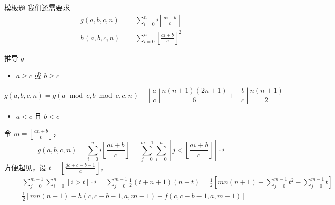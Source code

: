 \documentclass[UTF8]{beamer}
\begin{document}
    \begin{frame}{模板题}
        我们还需要求
        $$
        \begin{aligned}
        g(a,b,c,n)&=\sum_{i=0}^ni\left\lfloor \frac{ai+b}{c} \right\rfloor\\
        h(a,b,c,n)&=\sum_{i=0}^n\left\lfloor \frac{ai+b}{c} \right\rfloor^2
        \end{aligned}
        $$
    \end{frame}
    \begin{frame}{推导 $g$}
        \begin{itemize}
            \item $a\ge c$ 或 $b\ge c$
        \end{itemize}
        $$
        g(a,b,c,n)
        =g(a\bmod c,b\bmod c,c,n)+\left\lfloor\frac{a}{c}\right\rfloor\frac{n(n+1)(2n+1)}{6}+\left\lfloor\frac{b}{c}\right\rfloor\frac{n(n+1)}{2}
        $$
        
        \vspace{-0.5em}
        \begin{itemize}
            \item $a<c$ 且 $b<c$
        \end{itemize}
        \vspace{0.2em}
        令 $m=\left\lfloor\frac{an+b}{c}\right\rfloor$，
        $$
    g(a,b,c,n)=\sum_{i=0}^ni\left\lfloor \frac{ai+b}{c} \right\rfloor=\sum_{j=0}^{m-1}
    \sum_{i=0}^n\left[j<\left\lfloor\frac{ai+b}{c}\right\rfloor\right]\cdot i
    $$
方便起见，设 $t=\left\lfloor\frac{jc+c-b-1}{a}\right\rfloor$，
$$
\begin{aligned}
&=\sum_{j=0}^{m-1}\sum_{i=0}^n[i>t]\cdot i=\sum_{j=0}^{m-1}\frac{1}{2}(t+n+1)(n-t)=\frac{1}{2}\left[mn(n+1)-\sum_{j=0}^{m-1}t^2-\sum_{j=0}^{m-1}t\right]\\
&=\frac{1}{2}[mn(n+1)-h(c,c-b-1,a,m-1)-f(c,c-b-1,a,m-1)]
\end{aligned}
$$
    \end{frame}
\end{document}
